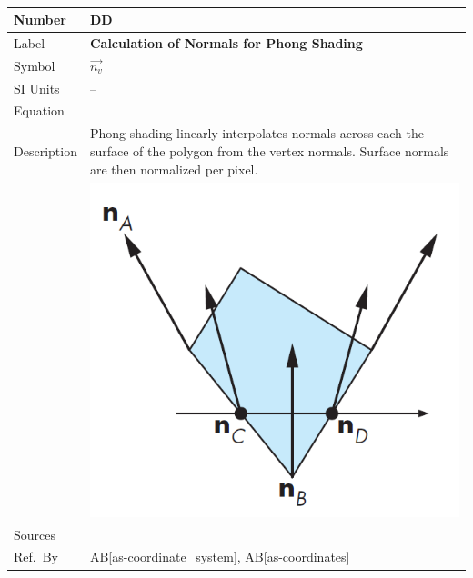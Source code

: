 \documentclass[12pt]{article}
\newcommand{\colAwidth}{0.13\textwidth}
\newcommand{\colBwidth}{0.82\textwidth}
\newcounter{defnum} %
\newcounter{datadefnum} %
\newcommand{\aBref}[1]{AB\ref{#1}}
\begin{document}
~\newline

\noindent
\begin{minipage}{\textwidth}
	\renewcommand*{\arraystretch}{1.5}
	\begin{tabular}{| p{\colAwidth} | p{\colBwidth}|}
		\hline
		\rowcolor[gray]{0.9}
		Number& DD{datadefnum}\thedatadefnum 
		\label{DD_Phong_Shading}\\
		\hline
		Label& \bf Calculation of Normals for Phong Shading\\
		\hline
		Symbol &$\vec{n_{v}}$\\
		\hline
		SI Units & --\\
		\hline
		Equation& \\
		\hline
		Description & Phong shading linearly interpolates normals across each 
		the surface of the polygon from the vertex normals. Surface normals are 
		then normalized per pixel.\\
		& \includegraphics[]{./images/phong-shading-interpolation} \\
		\hline
		Sources& \cite{shreiner2012}\\
		\hline
		Ref.\ By & \aBref{as-coordinate_system}, \aBref{as-coordinates} \\
		\hline
	\end{tabular}
\end{minipage}\\
\end{document}
